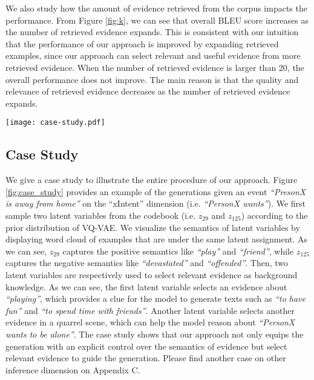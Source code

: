 \documentclass[11pt,a4paper]{article}
\begin{document}
We also study how the amount of evidence retrieved from the corpus impacts the performance. From Figure \ref{fig:k}, we can see that overall BLEU \mbox{score} increases as the number of retrieved evidence expands.
This is consistent with our intuition that the performance of our approach is improved by expanding retrieved examples, since our approach can select relevant and useful evidence from more retrieved evidence. When the number of retrieved evidence is larger than 20, the overall performance does not improve. The main reason is that the quality and relevance of retrieved evidence decreases as the number of retrieved evidence expands. 










\begin{figure*}[t!]
	\centering
	\texttt{[image: case-study.pdf]}
	\caption{An examples of Event2Mind dataset on the xIntent dimension (i.e. \textit{``PersonX wants''}).}
	\label{fig:case_study}
\end{figure*}

\subsection{Case Study}
We give a case study to illustrate the entire procedure of our approach. Figure \ref{fig:case_study} provides an example of the generations given an event \textit{``PresonX is away from home''} on the ``xIntent'' dimension (i.e. \textit{``PersonX wants''}). We first sample two latent variables from the codebook (i.e. $z_{29}$ and $z_{125}$) according to the prior distribution of VQ-VAE. We visualize the semantics of latent variables by displaying word cloud of examples that are under the same latent assignment. As we can see, $z_{29}$ captures the positive semantics like \textit{``play''} and \textit{``friend''}, while $z_{125}$ captures the negative semantics like \textit{``devastated''} and \textit{``offended''}. Then, two latent variables are respectively used to select relevant evidence as background knowledge. As we can see, the first latent variable selects an evidence about \textit{``playing''}, which provides a clue for the model to generate texts such as \textit{``to have fun''} and \textit{``to spend time with friends''}. Another latent variable selects another evidence in a quarrel scene, which can help the model reason about \textit{``PersonX wants to be alone''}. The case study shows that our approach not only equips the generation with an explicit control over the semantics of evidence but select relevant evidence to guide the generation. Please find another case on other inference dimension on Appendix C.
\end{document}
